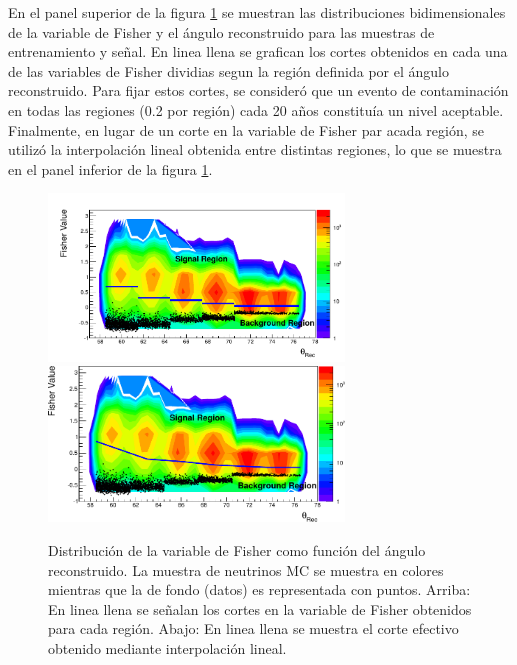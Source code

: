 	En el panel superior de la figura \ref{fig:fisher2dDGL} se muestran las distribuciones bidimensionales de la variable de Fisher y el ángulo reconstruido para las muestras de entrenamiento y señal. En linea llena se grafican los cortes obtenidos en cada una de las variables de Fisher dividias segun la región definida por el ángulo reconstruido.
	Para fijar estos cortes, se consideró que un evento de contaminación en todas las regiones (0.2 por región) cada 20 años constituía un nivel aceptable.
	Finalmente, en lugar de un corte en la variable de Fisher par acada región, se utilizó la interpolación lineal obtenida entre distintas regiones, lo que se muestra en el panel inferior de la figura \ref{fig:fisher2dDGL}.
	\begin{figure}[ht]
	\begin{center}
	\includegraphics[width=0.7\textwidth]{fig/seleccionAuger/fisher2dDGL}\\
	\includegraphics[width=0.7\textwidth]{fig/seleccionAuger/fisher2dInterpolDGL}
	\caption{Distribución de la variable de Fisher como función del ángulo reconstruido. La muestra de neutrinos MC se muestra en colores mientras que la de fondo (datos) es representada con puntos. Arriba: En linea llena se señalan los cortes en la variable de Fisher obtenidos para cada región. Abajo: En linea llena se muestra el corte efectivo obtenido mediante interpolación lineal.}
	\label{fig:fisher2dDGL}
	\end{center}
	\end{figure}
	
